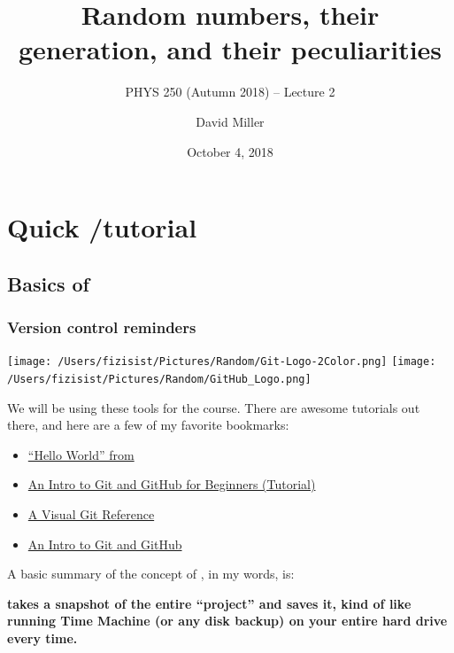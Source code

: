 \documentclass[hyperref={colorlinks=true}]{beamer}
\title[PHYS 250 (Autumn 2018) -- Lecture 1]{Random numbers, their generation, and their peculiarities}
\subtitle{PHYS 250 (Autumn 2018) -- Lecture 2}
\author[D.W.~Miller]{David Miller}
\institute[EFI, Chicago] 
{
  Department of Physics and the Enrico Fermi Institute\\
  University of Chicago
}
\date[October 4, 2018]{October 4, 2018}
\begin{document}

{
\begin{frame}
  \titlepage
\end{frame}
}

\section[Quick \git/\github tutorial]{Quick \git/\github tutorial}

\subsection[Basics of \git]{Basics of \git}

\begin{frame}%
  \frametitle{Version control reminders}
  
  \begin{center}
    \texttt{[image: /Users/fizisist/Pictures/Random/Git-Logo-2Color.png]}
    \texttt{[image: /Users/fizisist/Pictures/Random/GitHub\_Logo.png]}
  \end{center}

  We will be using these tools for the course. There are  awesome tutorials out there, and here are a few of my favorite bookmarks:
  
  \begin{itemize}
    \item \href{https://guides.github.com/activities/hello-world/}{``Hello World'' from \github}
    \item \href{https://product.hubspot.com/blog/git-and-github-tutorial-for-beginners}{An Intro to Git and GitHub for Beginners (Tutorial)}
    \item \href{http://marklodato.github.io/visual-git-guide/index-en.html}{A Visual Git Reference}
    \item \href{https://medium.com/@abhishekj/an-intro-to-git-and-github-1a0e2c7e3a2f}{An Intro to Git and GitHub}
  \end{itemize}

  A basic summary of the concept of \git, in my words, is:
  
  \begin{ucblock}{}
    \centering \textbf{\git takes a snapshot of the entire ``project'' and saves it, kind of like running Time Machine (or any disk backup) on your entire hard drive every time.}
  \end{ucblock}


\end{frame}
\end{document}
